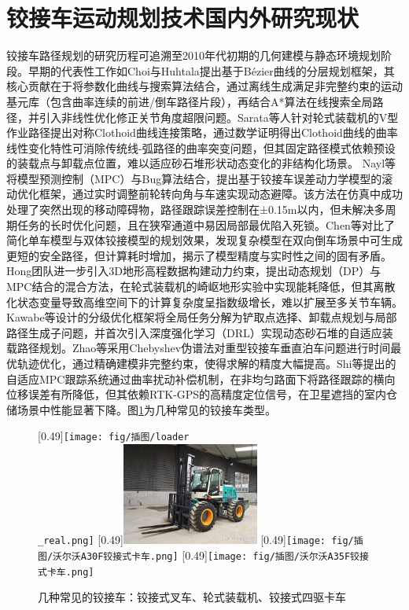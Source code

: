 \documentclass[master,academic]{ysuthesis} %
\begin{document}
	\section{铰接车运动规划技术国内外研究现状}
	铰接车路径规划的研究历程可追溯至2010年代初期的几何建模与静态环境规划阶段。早期的代表性工作如Choi与Huhtala提出基于Bézier曲线的分层规划框架，其核心贡献在于将参数化曲线与搜索算法结合，通过离线生成满足非完整约束的运动基元库（包含曲率连续的前进/倒车路径片段），再结合A*算法在线搜索全局路径，并引入非线性优化修正关节角度超限问题。Sarata等人针对轮式装载机的V型作业路径提出对称Clothoid曲线连接策略，通过数学证明得出Clothoid曲线的曲率线性变化特性可消除传统线-弧路径的曲率突变问题，但其固定路径模式依赖预设的装载点与卸载点位置，难以适应砂石堆形状动态变化的非结构化场景。 Nayl等将模型预测控制（MPC）与Bug算法结合，提出基于铰接车误差动力学模型的滚动优化框架，通过实时调整前轮转向角与车速实现动态避障。该方法在仿真中成功处理了突然出现的移动障碍物，路径跟踪误差控制在±0.15m以内，但未解决多周期任务的长时优化问题，且在狭窄通道中易因局部最优陷入死锁。Chen等对比了简化单车模型与双体铰接模型的规划效果，发现复杂模型在双向倒车场景中可生成更短的安全路径，但计算耗时增加，揭示了模型精度与实时性之间的固有矛盾。Hong团队进一步引入3D地形高程数据构建动力约束，提出动态规划（DP）与MPC结合的混合方法，在轮式装载机的崎岖地形实验中实现能耗降低，但其离散化状态变量导致高维空间下的计算复杂度呈指数级增长，难以扩展至多关节车辆。Kawabe等设计的分级优化框架将全局任务分解为铲取点选择、卸载点规划与局部路径生成子问题，并首次引入深度强化学习（DRL）实现动态砂石堆的自适应装载路径规划。Zhao等采用Chebyshev伪谱法对重型铰接车垂直泊车问题进行时间最优轨迹优化，通过精确建模非完整约束，使得求解的精度大幅提高。Shi等提出的自适应MPC跟踪系统通过曲率扰动补偿机制，在非均匀路面下将路径跟踪的横向位移误差有所降低，但其依赖RTK-GPS的高精度定位信号，在卫星遮挡的室内仓储场景中性能显著下降。图\ref{fig:几种典型的铰接车案例}为几种常见的铰接车类型。
	\begin{figure}[!ht]
		\centering
		[0.49\textwidth]{\texttt{[image: fig/插图/loader\\\_real.png]}}
		[0.49\textwidth]{\includegraphics[width=0.4\textwidth]{fig/插图/四驱铰接式叉车.jpg}}
		[0.49\textwidth]{\texttt{[image: fig/插图/沃尔沃A30F铰接式卡车.png]}}
		[0.49\textwidth]{\texttt{[image: fig/插图/沃尔沃A35F铰接式卡车.png]}}
		\caption{几种常见的铰接车：铰接式叉车、轮式装载机、铰接式四驱卡车}
		\label{fig:几种典型的铰接车案例}
	\end{figure}
\end{document}
